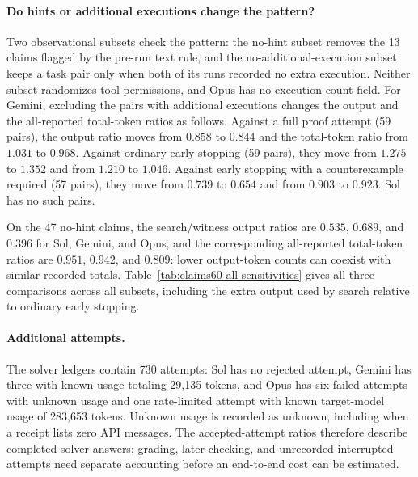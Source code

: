 \paragraph{Do hints or additional executions change the pattern?}
Two observational subsets check the pattern: the no-hint subset removes the 13 claims flagged by the pre-run text rule, and the no-additional-execution subset keeps a task pair only when both of its runs recorded no extra execution. Neither subset randomizes tool permissions, and Opus has no execution-count field. For Gemini, excluding the pairs with additional executions changes the output and the all-reported total-token ratios as follows. Against a full proof attempt (59 pairs), the output ratio moves from $0.858$ to $0.844$ and the total-token ratio from $1.031$ to $0.968$. Against ordinary early stopping (59 pairs), they move from $1.275$ to $1.352$ and from $1.210$ to $1.046$. Against early stopping with a counterexample required (57 pairs), they move from $0.739$ to $0.654$ and from $0.903$ to $0.923$. Sol has no such pairs.

On the 47 no-hint claims, the search/witness output ratios are $0.535$, $0.689$, and $0.396$ for Sol, Gemini, and Opus, and the corresponding all-reported total-token ratios are $0.951$, $0.942$, and $0.809$: lower output-token counts can coexist with similar recorded totals. Table~\ref{tab:claims60-all-sensitivities} gives all three comparisons across all subsets, including the extra output used by search relative to ordinary early stopping.

\begingroup\scriptsize\setlength{\tabcolsep}{3pt}

\endgroup



\paragraph{Additional attempts.}
The solver ledgers contain 730 attempts: Sol has no rejected attempt, Gemini has three with known usage totaling 29,135 tokens, and Opus has six failed attempts with unknown usage and one rate-limited attempt with known target-model usage of 283,653 tokens. Unknown usage is recorded as unknown, including when a receipt lists zero API messages. The accepted-attempt ratios therefore describe completed solver answers; grading, later checking, and unrecorded interrupted attempts need separate accounting before an end-to-end cost can be estimated.

